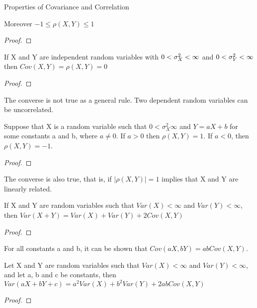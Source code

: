 Properties of Covariance and Correlation

\begin{proposition}
Moreover $-1 \leq \rho\left(X,Y\right) \leq 1$
\end{proposition}
\begin{proof}
\end{proof}

\begin{proposition}
If X and Y are independent random variables with $0<\text{\ensuremath{\sigma_{X}^{2}}}<\infty$ and $0<\text{\ensuremath{\sigma_{Y}^{2}}}<\infty$ then $Cov\left(X,Y\right)=\rho\left(X,Y\right)=0$
\end{proposition}
\begin{proof}
\end{proof}

The converse is not true as a general rule. Two dependent random variables can be uncorrelated.

\begin{proposition}
Suppose that X is a random variable such that $0<\sigma_{X}^{2}\infty$ and $Y=aX+b$ for some constants a and b, where $a\neq0$. If $a>0$ then $\rho\left(X,Y\right)=1$. If $a<0$, then $\rho\left(X,Y\right)=-1$.
\end{proposition}
\begin{proof}
\end{proof}

The converse is also true, that is, if $\left|\rho\left(X,Y\right)\right|=1$ implies that X and Y are linearly related.

\begin{proposition}
If X and Y are random variables such that $Var\left(X\right)<\infty$ and $Var\left(Y\right)<\infty$, then $Var\left(X+Y\right)=Var\left(X\right)+Var\left(Y\right)+2Cov\left(X,Y\right)$
\end{proposition}
\begin{proof}
\end{proof}

For all constants a and b, it can be shown that $Cov\left(aX,bY\right)=abCov\left(X,Y\right)$.

\begin{proposition}
Let X and Y are random variables such that $Var\left(X\right)<\infty$ and $Var\left(Y\right)<\infty$, and let a, b and c be constants, then $Var\left(aX+bY+c\right)=a^{2}Var\left(X\right)+b^{2}Var\left(Y\right)+2abCov\left(X,Y\right)$
\end{proposition}
\begin{proof}
\end{proof}

